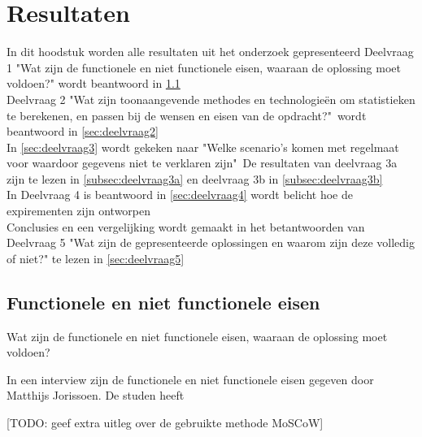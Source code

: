 \chapter{Resultaten}

In dit hoodstuk worden alle resultaten uit het onderzoek gepresenteerd
Deelvraag 1 "Wat zijn de functionele en niet functionele eisen, waaraan de oplossing moet voldoen?" wordt beantwoord in \ref{sec:deelvraag1} \\

Deelvraag 2 "Wat zijn toonaangevende methodes en technologieën om statistieken te berekenen, en passen bij de wensen en eisen van de opdracht?"\  wordt beantwoord in \ref{sec:deelvraag2} \\

In \ref{sec:deelvraag3} wordt gekeken naar "Welke scenario's komen met regelmaat voor waardoor gegevens niet te verklaren zijn"\  
De resultaten van deelvraag 3a zijn te lezen in \ref{subsec:deelvraag3a} en deelvraag 3b in \ref{subsec:deelvraag3b} \\

In Deelvraag 4 is beantwoord in \ref{sec:deelvraag4} wordt belicht hoe de expirementen zijn ontworpen \\

Conclusies en een vergelijking wordt gemaakt in het betantwoorden van Deelvraag 5 "Wat zijn de gepresenteerde oplossingen en waarom zijn deze volledig of niet?" te lezen in \ref{sec:deelvraag5}


\clearpage

\section{Functionele en niet functionele eisen}
\label{sec:deelvraag1}

Wat zijn de functionele en niet functionele eisen, waaraan de oplossing moet voldoen?

In een interview zijn de functionele en niet functionele eisen gegeven door Matthijs Jorissoen. De studen heeft 

[TODO: geef extra uitleg over de gebruikte methode MoSCoW]

\begin{comment}
Een functionele eis kan gezien worden als iets dat de gebruiker nodig heeft om het doel te bereiken of een bepaalde voorwaarde waaraan de oplossing moet voldoen.

Een non functionele eis is een beperking doe wordt opgelegd op een mogelijke oplossing, met het doel om functionele eisen te behalen of het doel van het project.
\end{comment}

